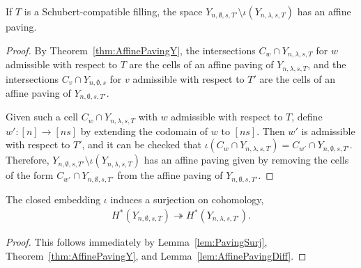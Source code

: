 \documentclass[12pt]{amsart}
\newcommand{\la}{\lambda}
\begin{document}
\begin{lemma}\label{lem:AffinePavingDiff}
If $T$ is a Schubert-compatible filling, the space $Y_{n,\emptyset,s,T'}\setminus \iota(Y_{n,\la,s,T})$ has an affine paving.
\end{lemma}

\begin{proof}
By Theorem~\ref{thm:AffinePavingY}, the intersections $C_w\cap Y_{n,\la,s,T}$ for $w$ admissible with respect to $T$ are the cells of an affine paving of $Y_{n,\la,s,T}$, and the intersections $C_v\cap Y_{n,\emptyset,s}$ for $v$ admissible with respect to $T'$ are the cells of an affine paving of $Y_{n,\emptyset,s,T'}$.

Given such a cell $C_w\cap Y_{n,\la,s,T}$ with $w$ admissible with respect to $T$, define $w' : [n]\to [ns]$ by extending the codomain of $w$ to $[ns]$. Then $w'$ is admissible with respect to $T'$, and it can be checked that $\iota(C_w\cap Y_{n,\la,s,T}) = C_{w'}\cap Y_{n,\emptyset,s,T'}$. Therefore, $Y_{n,\emptyset,s,T'}\setminus \iota(Y_{n,\la,s,T})$ has an affine paving given by removing the cells of the form $C_{w'}\cap Y_{n,\emptyset,s,T'}$ from the affine paving of $Y_{n,\emptyset,s,T'}$.
\end{proof}





\begin{corollary}\label{cor:Surj}
The closed embedding $\iota$ induces a surjection on cohomology,
\begin{align}
H^*(Y_{n,\emptyset,s,T}) \twoheadrightarrow H^*(Y_{n,\la,s,T'}).
\end{align}
\end{corollary}
\begin{proof}
This follows immediately by Lemma~\ref{lem:PavingSurj}, Theorem~\ref{thm:AffinePavingY}, and Lemma~\ref{lem:AffinePavingDiff}.
\end{proof}





\end{document}
